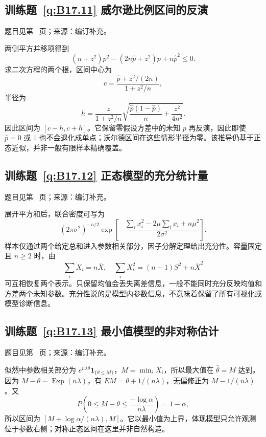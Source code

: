\documentclass[UTF8,12pt,a4paper,fontset=fandol]{ctexbook}
\begin{document}
\subsection*{训练题~\ref{q:B17.11} 威尔逊比例区间的反演}\label{a:B17.11}{\small 题目见第~\pageref{q:B17.11} 页；来源：编订补充。}
\begin{solve}两侧平方并移项得到\[(n+z^2)p^2-(2n\widehat p+z^2)p+n\widehat p^2\le0.\]求二次方程的两个根，区间中心为\[c=\frac{\widehat p+z^2/(2n)}{1+z^2/n},\]半径为\[h=\frac{z}{1+z^2/n}\sqrt{\frac{\widehat p(1-\widehat p)}n+\frac{z^2}{4n^2}}.\]因此区间为 $[c-h,c+h]$。它保留零假设方差中的未知 $p$ 再反演，因此即使 $\widehat p=0$ 或 $1$ 也不会退化成单点；沃尔德区间在这些情形半径为零。该推导仍基于正态近似，并非一般有限样本精确覆盖。\end{solve}

\subsection*{训练题~\ref{q:B17.12} 正态模型的充分统计量}\label{a:B17.12}{\small 题目见第~\pageref{q:B17.12} 页；来源：编订补充。}
\begin{solve}展开平方和后，联合密度可写为\[(2\pi\sigma^2)^{-n/2}\exp\left[-\frac{\sum_i x_i^2-2\mu\sum_i x_i+n\mu^2}{2\sigma^2}\right].\]样本仅通过两个给定总和进入参数相关部分，因子分解定理给出充分性。容量固定且 $n\ge2$ 时，由\[\sum_iX_i=n\overline X,\quad\sum_iX_i^2=(n-1)S^2+n\overline X^2\]可互相恢复两个表示。只保留均值会丢失离差信息，一般不能同时充分反映均值和方差两个未知参数。充分性说的是模型内参数信息，不意味着保留了所有可视化或模型诊断信息。\end{solve}

\subsection*{训练题~\ref{q:B17.13} 最小值模型的非对称估计}\label{a:B17.13}{\small 题目见第~\pageref{q:B17.13} 页；来源：编订补充。}
\begin{solve}似然中参数相关部分为 $e^{n\lambda\theta}\mathbf1_{\{\theta\le M\}}$，$M=\min_iX_i$，所以最大值在 $\widehat\theta=M$ 达到。因为 $M-\theta\sim\operatorname{Exp}(n\lambda)$，有 $EM=\theta+1/(n\lambda)$，无偏修正为 $M-1/(n\lambda)$。又\[P\left(0\le M-\theta\le\frac{-\log\alpha}{n\lambda}\right)=1-\alpha,\]所以区间为 $[M+\log\alpha/(n\lambda),M]$。它以最小值为上界，体现模型只允许观测位于参数右侧；对称正态区间在这里并非自然构造。\end{solve}
\end{document}
